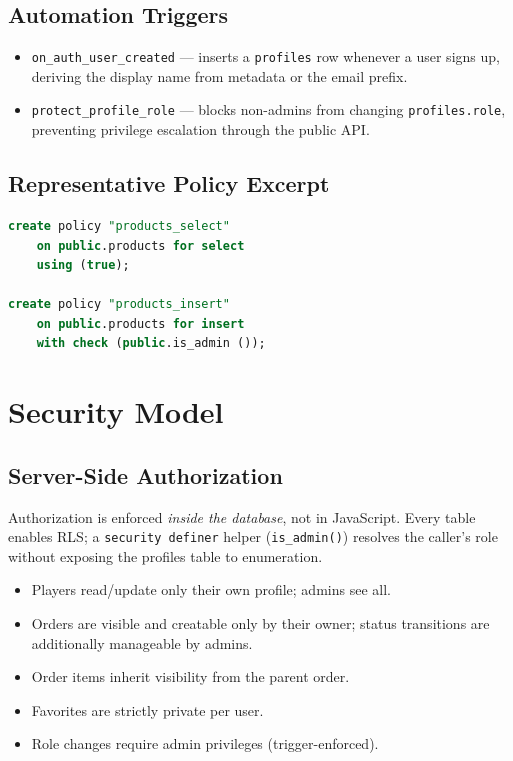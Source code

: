\documentclass[11pt,a4paper]{article}
\begin{document}
\subsection{Automation Triggers}

\begin{itemize}[nosep]
    \item \texttt{on\_auth\_user\_created} --- inserts a \texttt{profiles}
          row whenever a user signs up, deriving the display name from
          metadata or the email prefix.
    \item \texttt{protect\_profile\_role} --- blocks non-admins from
          changing \texttt{profiles.role}, preventing privilege
          escalation through the public API.
\end{itemize}

\subsection{Representative Policy Excerpt}

\begin{lstlisting}[language=SQL,caption={Row-level security: products are world-readable, admin-writable.}]
create policy "products_select"
    on public.products for select
    using (true);

create policy "products_insert"
    on public.products for insert
    with check (public.is_admin ());
\end{lstlisting}


\section{Security Model}

\subsection{Server-Side Authorization}

Authorization is enforced \emph{inside the database}, not in JavaScript.
Every table enables RLS; a \texttt{security definer} helper
(\texttt{is\_admin()}) resolves the caller's role without exposing the
profiles table to enumeration.

\begin{itemize}[nosep]
    \item Players read/update only their own profile; admins see all.
    \item Orders are visible and creatable only by their owner; status
          transitions are additionally manageable by admins.
    \item Order items inherit visibility from the parent order.
    \item Favorites are strictly private per user.
    \item Role changes require admin privileges (trigger-enforced).
\end{itemize}
\end{document}
